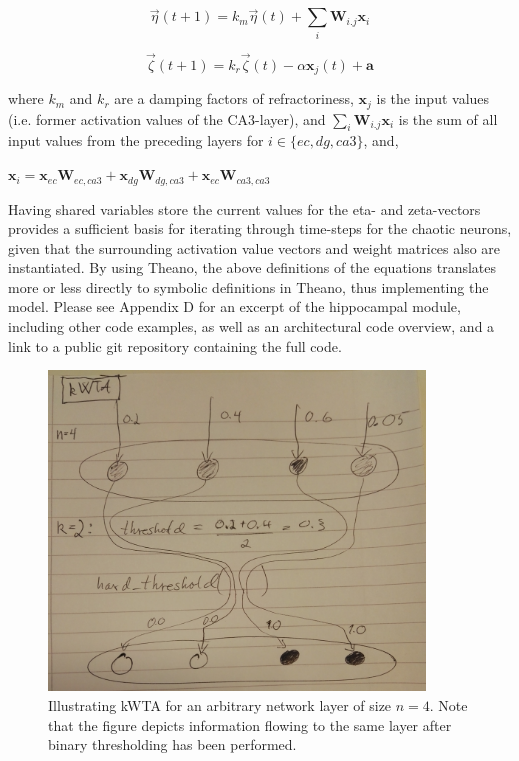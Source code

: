 \begin{equation}
    \vec{\eta}(t+1) = k_m \vec{\eta}(t) + \sum_{i} \textbf{W}_{i.j} \textbf{x}_i
\end{equation}

\begin{equation}
    \vec{\zeta}(t+1) = k_r \vec{\zeta}(t) - \alpha \textbf{x}_j(t) + \textbf{a}
\end{equation}

where $k_m$ and $k_r$ are a damping factors of refractoriness, $\textbf{x}_j$ is the input values (i.e. former activation values of the CA3-layer), and $\sum_{i} \textbf{W}_{i.j} \textbf{x}_i$ is the sum of all input values from the preceding layers for $i\in\{ec, dg, ca3\}$, and,

\begin{center}
\begin{math}
    \textbf{x}_i = \textbf{x}_{ec} \textbf{W}_{ec, ca3} + \textbf{x}_{dg} \textbf{W}_{dg, ca3} + \textbf{x}_{ec} \textbf{W}_{ca3, ca3}
\end{math}
\end{center}

Having shared variables store the current values for the eta- and zeta-vectors provides a sufficient basis for iterating through time-steps for the chaotic neurons, given that the surrounding activation value vectors and weight matrices also are instantiated. By using Theano, the above definitions of the equations translates more or less directly to symbolic definitions in Theano, thus implementing the model. Please see Appendix D for an excerpt of the hippocampal module, including other code examples, as well as an architectural code overview, and a link to a public git repository containing the full code.

\begin{figure}
    \centering
    \includegraphics[width=10cm]{fig/kWTA_network_layout}
    \caption{Illustrating kWTA for an arbitrary network layer of size $n=4$. Note that the figure depicts information flowing to  the same layer after binary thresholding has been performed.}
    \label{fig:kWTA_illustration}
\end{figure}

